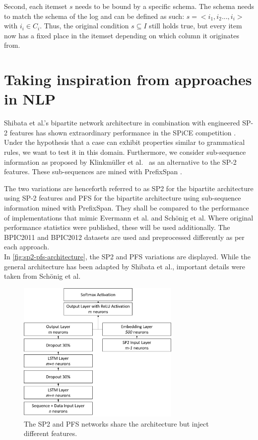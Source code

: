 Second, each itemset $s$ needs to be bound by a specific schema. The schema needs to match the schema of the log and can be defined as such: $s = <i_1, i_2 ..., i_i>$ with $i_i \in C_i$. Thus, the original condition $s \subseteq I$ still holds true, but every item now has a fixed place in the itemset depending on which column it originates from.

\section{Taking inspiration from approaches in NLP}
\label{sec:contrib:nlp-inspiration}
Shibata et al.'s bipartite network architecture in combination with engineered SP-2 features has shown extraordinary performance in the SPiCE competition \cite{web:spice}. Under the hypothesis that a case can exhibit properties similar to grammatical rules, we want to test it in this domain. Furthermore, we consider sub-sequence information as proposed by Klinkmüller et al.~\cite{klinkmuller2018reliablemonitoring} as an alternative to the SP-2 features. These sub-sequences are mined with PrefixSpan \cite{pei2001prefixspan}.

The two variations are henceforth referred to as SP2 for the bipartite architecture using SP-2 features and PFS for the bipartite architecture using sub-sequence information mined with PrefixSpan. They shall be compared to the performance of implementations that mimic Evermann et al. and Schönig et al. Where original performance statistics were published, these will be used additionally. The BPIC2011 \cite{BPIC2011} and BPIC2012 \cite{BPIC2012} datasets are used and preprocessed differently as per each approach.\\

In \autoref{fig:sp2-pfs-architecture}, the SP2 and PFS variations are displayed. While the general architecture has been adapted by Shibata et al., important details were taken from Schönig et al.

\begin{figure}
    \centering
    \includegraphics[width=0.7\textwidth]{gfx/sp2-network-architecture.png}
    \caption{The SP2 and PFS networks share the architecture but inject different features.}
    \label{fig:sp2-pfs-architecture}
\end{figure}

